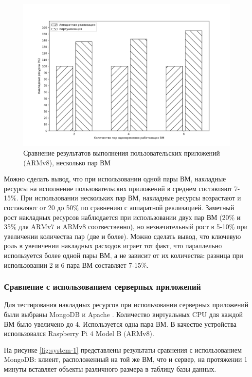 \begin{figure}[h]
	\centering
	\includegraphics[width=\textwidth]{img/user-2-armv8.pdf}
	\caption{Сравнение результатов выполнения пользовательских приложений (ARMv8), несколько пар ВМ}
	\label{fig:perf-user-2-armv8}
\end{figure}

Можно сделать вывод, что при использовании одной пары ВМ, накладные ресурсы на исполнение пользовательских приложений в среднем составляют 7-15\%. При использовании нескольких пар ВМ, накладные ресурсы возрастают и составляют от 20 до 50\% по сравнению с аппаратной реализацией. Заметный рост накладных ресурсов наблюдается при использовании двух пар ВМ (20\% и 35\% для ARMv7 и ARMv8 соотвественно), но незначительный рост в 5-10\% при увеличении количества пар (две и более). Можно сделать вывод, что ключевую роль в увеличении накладных расходов играет тот факт, что параллельно используется более одной пары ВМ, а не зависит от их количества: разница при использовании 2 и 6 пара ВМ составляет 7-15\%.

\subsubsection{Сравнение с использованием серверных приложений}

Для тестирования накладных ресурсов при использовании серверных приложений были выбраны MongoDB \cite{mongodb} и Apache \cite{Apache}. Количество виртуальных CPU для каждой ВМ было увеличено до 4. Используется одна пара ВМ. В качестве устройства использовался Raspberry Pi 4 Model B (ARMv8).

На рисунке \ref{fig:system-1} представлены результаты сравнения с использованием MongoDB: клиент, расположенный на той же ВМ, что и сервер, на протяжении 1 минуты вставляет объекты различного размера в таблицу базы данных. 

